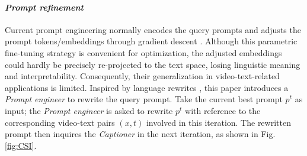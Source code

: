 

\paragraph{\textbf{\textit{Prompt refinement}}}
Current prompt engineering normally encodes the query prompts and adjusts the prompt tokens/embeddings through gradient descent \cite{pryzant2023automatic,yang2023dynamic}. Although this parametric fine-tuning strategy is convenient for optimization, the adjusted embeddings could hardly be precisely re-projected to the text space, losing linguistic meaning and interpretability. Consequently, their generalization in video-text-related applications is limited.
Inspired by language rewrites \cite{fan2024improving}, this paper introduces a \textit{Prompt engineer} to rewrite the query prompt. Take the current best prompt $p^t$ as input; the \textit{Prompt engineer} is asked to rewrite $p^t$ with reference to the corresponding video-text pairs $(x,t)$ involved in this iteration. The rewritten prompt then inquires the \textit{Captioner} in the next iteration, as shown in Fig. \ref{fig:CSI}.

